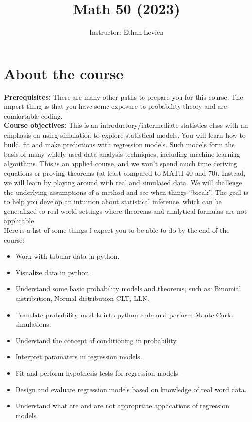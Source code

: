 

\title{Math 50 (2023)}
\author{Instructor: Ethan Levien}



\maketitle


\tableofcontents
\section*{About the course}



\noindent
{\bf Prerequisites:} There are many other paths to prepare you for this course. The import thing is that you have some exposure to probability theory and are comfortable coding. \\

\noindent
{\bf Course objectives:} This is an introductory/intermediate statistics class with an emphasis on using simulation to explore statistical models. You will learn how to build, fit and make predictions with regression models. Such models form the basis of many widely used data analysis techniques, including machine learning algorithms. This is an applied course, and we won’t spend much time deriving equations or proving theorems (at least compared to MATH 40 and 70). Instead, we will learn by playing around with real and simulated data. We will challenge the underlying assumptions of a method and see when things “break”. The goal is to help you develop an intuition about statistical inference, which can be generalized to real world settings where theorems and analytical formulas are not applicable.\\

Here is a list of some things I expect you to be able to do by the end of the course:
\begin{itemize}
\item Work with tabular data in python. 
\item Visualize data in python. 
\item Understand some basic probability models and theorems, such as: Binomial distribution, Normal distribution CLT, LLN.  
\item Translate probability models into python code and perform Monte Carlo simulations. 
\item Understand the concept of conditioning in probability. 
\item Interpret paramaters in regression models. 
\item Fit and perform hypothesis tests for regression models.
\item Design and evaluate regression models based on knowledge of real word data.
\item Understand what are and are not appropriate applications of regression models. \\
\end{itemize}


